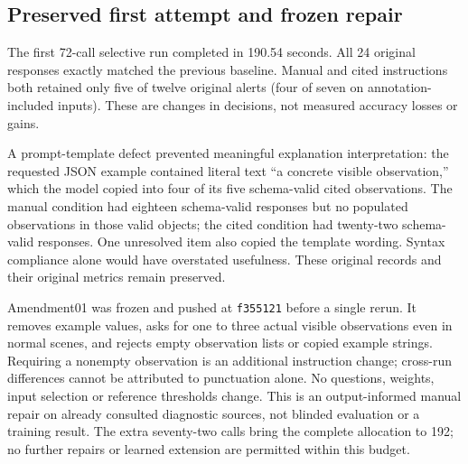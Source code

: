 \subsection{Preserved first attempt and frozen repair}
The first 72-call selective run completed in 190.54 seconds. All 24 original responses exactly matched the previous baseline. Manual and cited instructions both retained only five of twelve original alerts (four of seven on annotation-included inputs). These are changes in decisions, not measured accuracy losses or gains.

A prompt-template defect prevented meaningful explanation interpretation: the requested JSON example contained literal text ``a concrete visible observation,'' which the model copied into four of its five schema-valid cited observations. The manual condition had eighteen schema-valid responses but no populated observations in those valid objects; the cited condition had twenty-two schema-valid responses. One unresolved item also copied the template wording. Syntax compliance alone would have overstated usefulness. These original records and their original metrics remain preserved.

Amendment01 was frozen and pushed at \texttt{f355121} before a single rerun. It removes example values, asks for one to three actual visible observations even in normal scenes, and rejects empty observation lists or copied example strings. Requiring a nonempty observation is an additional instruction change; cross-run differences cannot be attributed to punctuation alone. No questions, weights, input selection or reference thresholds change. This is an output-informed manual repair on already consulted diagnostic sources, not blinded evaluation or a training result. The extra seventy-two calls bring the complete allocation to 192; no further repairs or learned extension are permitted within this budget.
